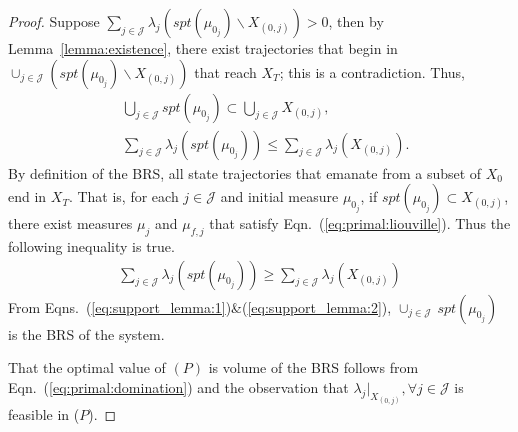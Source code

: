   \begin{proof}
  Suppose $\sum_{j\in \mathcal J}\lambda_j(spt(\mu_{0_j})\backslash X_{(0,j)})>0$, then by Lemma~\ref{lemma:existence}, there exist trajectories that begin in $\cup_{j\in \mathcal J}(spt(\mu_{0_j})\backslash X_{(0,j)})$ that reach $X_T$; this is a contradiction. Thus,
  \begin{align}
  &\bigcup_{j\in \mathcal J} spt(\mu_{0_j})\subset \bigcup_{j\in \mathcal J} X_{(0,j)},\\
  &\sum_{j\in \mathcal J}\lambda_j(spt(\mu_{0_j}))\le\sum_{j\in \mathcal J}\lambda_j( X_{(0,j)}).
  \label{eq:support_lemma:1}
  \end{align}
    By definition of the BRS, all state trajectories that emanate from a subset of $X_0$ end in $X_T$. That is, for each $j\in \mathcal J$ and initial measure $\mu_{0_j}$, if $spt(\mu_{0_j})\subset X_{(0,j)}$, there exist measures $\mu_{j}$ and $\mu_{f,j}$ that satisfy Eqn.~(\ref{eq:primal:liouville}). Thus the following inequality is true.
    \begin{align}
    \sum_{j\in \mathcal J}\lambda_j(spt(\mu_{0_j}))\ge \sum_{j\in \mathcal J}\lambda_j(X_{(0,j)})
      \label{eq:support_lemma:2}
    \end{align}
   From Eqns.~(\ref{eq:support_lemma:1})\&(\ref{eq:support_lemma:2}), $\cup_{j\in \mathcal J}\,spt(\mu_{0_j})$ is the BRS of the system.
    \par
    That the optimal value of $(P)$ is volume of the BRS follows from Eqn.~(\ref{eq:primal:domination}) and the observation that \mbox{$\lambda_{j}|_{X_{(0,j)}},\forall j\in \mathcal J$} is feasible in ($P$).
  \end{proof}


